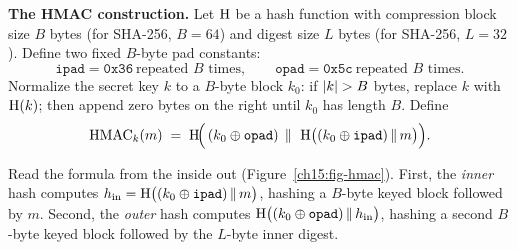 \begin{focusbox}
\textbf{The HMAC construction.} Let $\operatorname{H}$ be a hash function with compression block size $B$ bytes (for SHA-256, $B=64$) and digest size $L$ bytes (for SHA-256, $L=32$). Define two fixed $B$-byte pad constants:
\[
  \texttt{ipad} = \texttt{0x36}\ \text{repeated $B$ times},\qquad
  \texttt{opad} = \texttt{0x5c}\ \text{repeated $B$ times}.
\]
Normalize the secret key $k$ to a $B$-byte block $k_0$: if $\lvert k\rvert > B$ bytes, replace $k$ with $\operatorname{H}(k)$; then append zero bytes on the right until $k_0$ has length $B$. Define
\[
  \mathrm{HMAC}_k(m) \;=\; \operatorname{H}\!\Bigl(\,(k_0\oplus\texttt{opad})\;\,\|\,\;\operatorname{H}\bigl((k_0\oplus\texttt{ipad})\,\|\, m\bigr)\Bigr).
\]
\end{focusbox}

Read the formula from the inside out (Figure~\ref{ch15:fig-hmac}). First, the \emph{inner} hash computes $h_{\mathrm{in}} = \operatorname{H}\bigl((k_0\oplus\texttt{ipad})\,\|\, m\bigr)$, hashing a $B$-byte keyed block followed by $m$. Second, the \emph{outer} hash computes $\operatorname{H}\bigl((k_0\oplus\texttt{opad})\,\|\, h_{\mathrm{in}}\bigr)$, hashing a second $B$-byte keyed block followed by the $L$-byte inner digest.

